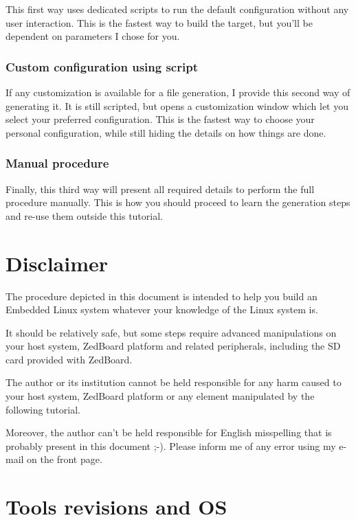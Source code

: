 \documentclass[openany,a4paper]{book}
\begin{document}
This first way uses dedicated scripts to run the default configuration without any user interaction.
This is the fastest way to build the target, but you'll be dependent on parameters I chose for you.

\subsubsection{Custom configuration using script}

If any customization is available for a file generation, I provide this second way of generating it.
It is still scripted, but opens a customization window which let you select your preferred configuration.
This is the fastest way to choose your personal configuration, while still hiding the details on how things are done.

\subsubsection{Manual procedure}

Finally, this third way will present all required details to perform the full procedure manually.
This is how you should proceed to learn the generation steps and re-use them outside this tutorial.


\section{Disclaimer}

The procedure depicted in this document is intended to help you build an Embedded Linux system whatever your knowledge of the Linux system is.

It should be relatively safe, but some steps require advanced manipulations on your host system, ZedBoard platform and related peripherals, including the SD card provided with ZedBoard.

The author or its institution cannot be held responsible for any harm caused to your host system, ZedBoard platform or any element manipulated by the following tutorial.

Moreover, the author can't be held responsible for English misspelling that is probably present in this document ;-).
Please inform me of any error using my e-mail on the front page.


\section{Tools revisions and OS}
\end{document}
